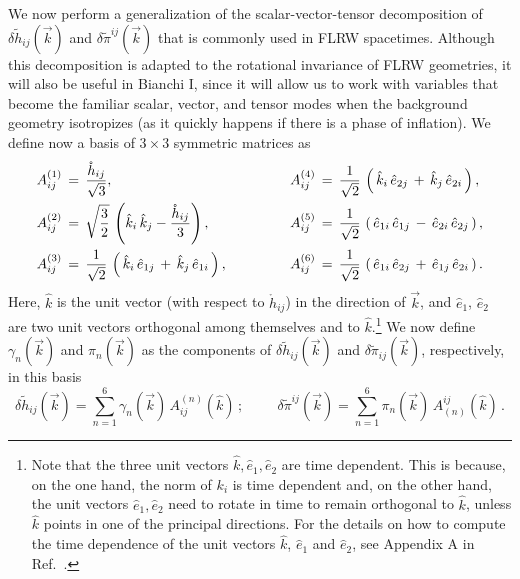 \documentclass[11pt,tightenlines,eqsecnum,floats,aps,amsmath,amssymb,nofootinbib,prd,floatfix]{revtex4}
\def\f{\frac}
\def\t{\tilde}
\def\t{\tilde}
\def\h{\hat}
\newcommand{\be}{\nopagebreak[3]\begin{equation}}
\newcommand{\ee}{\end{equation}}
\def\hz{\mathring{h}}
\def\l{\left}
\def\r{\right}
\def\v{\vec}
\newcommand{\<}{\langle}
\renewcommand{\>}{\rangle}
\begin{document}
We now perform a generalization of the  scalar-vector-tensor decomposition of $\delta \t{h}_{ij}(\vec{k})$ and $\delta \t{\pi}^{ij}(\vec{k})$ that is commonly used in FLRW spacetimes. Although this decomposition is adapted to the rotational invariance of FLRW geometries, it will also be useful in  Bianchi I, since it will allow us to work with variables that become the familiar scalar, vector, and tensor modes when the background geometry isotropizes (as it quickly happens if there is a phase of inflation). We define now a basis of $3\times 3$ symmetric matrices as
%
\begin{align}
 {A}^{{(1)}}_{ij}\, &=\, \f{\hz_{ij}}{\sqrt{3}}, \hspace{0.5in} & {A}^{(4)}_{ij}\, &=\,\f{1}{\sqrt{2}}\, \l(\, \hat{ k}_i\, \h e_{2 j}\, +\, \hat{ k}_j\, \h e_{2 i} \,\r),\nonumber\\
 {A}^{(2)}_{ij}\, &=\,\sqrt{\f{3}{2}}\,\l(\hat{ k}_i\,\hat{ k}_j - \f{\hz_{ij}}{3}\r), \hspace{.5in}  &{A}^{(5)}_{ij}\,& =\, \f{1}{\sqrt{2}}\, \l(\, \hat e_{1 i}\, \h e_{1 j}\, -\, \hat e_{2 i}\, \h e_{2 j} \,\r),  \nonumber\\
{A}^{(3)}_{ij}\, &=\, \f{1}{\sqrt{2}}\, \l(\, \hat{ k}_i\, \h e_{1 j}\, +\, \hat{ k}_j\, \h e_{1 i}\,\r),
 \hspace{.5in} &{A}^{(6)}_{ij}\, &=\,\f{1}{\sqrt{2}}\, \l(\, \hat e_{1 i}\, \h e_{2 j}\, +\, \hat e_{1 j}\, \h e_{2 i} \,\r). \label{matrixbases}
\end{align}
%
Here, $\hat{ k}$ is the unit vector (with respect to $\hz_{ij}$) in the direction of $\v{k}$, and $\h e_{1}$, $\h e_{2}$ are two  unit vectors orthogonal among themselves and  to $\hat{ k}$.\footnote{Note that the three unit vectors $\hat{k},\h e_{1}, \h e_{2}$ are time dependent. This is because, on the one hand, the norm of $k_i$ is time dependent and, on the other hand, the unit vectors $\h e_{1}, \h e_{2}$ need to rotate in time to remain orthogonal to $\hat{k}$, unless $\hat{k}$ points in one of the principal directions. For the details on how to compute the time dependence of the unit vectors $\hat{ k}$, $\h e_1$ and $\h e_2$, see Appendix A in Ref.\ \cite{aos}.} We now define $\gamma_n(\vec k)$ and $\pi_n(\vec k)$ as the components of $\delta \tilde h_{ij}(\vec{k})$ and $\delta \tilde \pi_{ij}(\vec{k})$, respectively, in this basis
%
 \be \label{eq:dh-to-gamma}\delta \tilde h_{ij}(\vec{k})=\sum_{n=1}^{6}  \gamma_n(\vec{k}) \,  {A}^{{(n)}}_{ij}(\hat k)\, ; \hspace{1cm} \delta \tilde \pi^{ij}(\vec{k})=\sum_{n=1}^{6}  \pi_n(\vec{k}) \,  {A}_{{(n)}}^{ij} (\hat k)\, .  \ee
\end{document}
